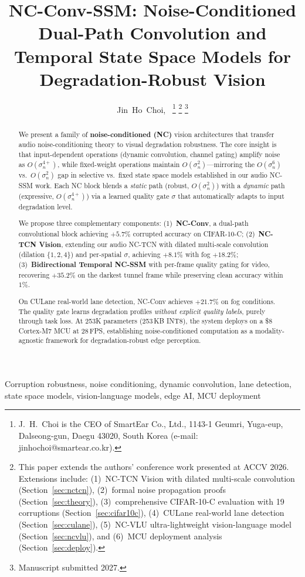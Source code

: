 \documentclass[journal]{IEEEtran}
\title{NC-Conv-SSM: Noise-Conditioned Dual-Path Convolution and Temporal State Space Models for Degradation-Robust Vision}
\author{Jin~Ho~Choi,~\IEEEmembership{Member,~IEEE}%
\thanks{J.~H.~Choi is the CEO of SmartEar Co., Ltd., 1143-1 Geumri, Yuga-eup, Dalseong-gun, Daegu 43020, South Korea (e-mail: jinhochoi@smartear.co.kr).}%
\thanks{This paper extends the authors' conference work presented at ACCV 2026. Extensions include: (1)~NC-TCN Vision with dilated multi-scale convolution (Section~\ref{sec:nctcn}), (2)~formal noise propagation proofs (Section~\ref{sec:theory}), (3)~comprehensive CIFAR-10-C evaluation with 19 corruptions (Section~\ref{sec:cifar10c}), (4)~CULane real-world lane detection (Section~\ref{sec:culane}), (5)~NC-VLU ultra-lightweight vision-language model (Section~\ref{sec:ncvlu}), and (6)~MCU deployment analysis (Section~\ref{sec:deploy}).}%
\thanks{Manuscript submitted 2027.}}
\begin{document}
\maketitle

\begin{abstract}
We present a family of \textbf{noise-conditioned (NC)} vision architectures that transfer audio noise-conditioning theory to visual degradation robustness.
The core insight is that input-dependent operations (dynamic convolution, channel gating) amplify noise as $O(\sigma_n^{4+})$, while fixed-weight operations maintain $O(\sigma_n^2)$---mirroring the $O(\sigma_n^6)$ vs.\ $O(\sigma_n^2)$ gap in selective vs.\ fixed state space models established in our audio NC-SSM work.
Each NC block blends a \textcolor{fixcolor}{\emph{static}} path (robust, $O(\sigma_n^2)$) with a \textcolor{dyncolor}{\emph{dynamic}} path (expressive, $O(\sigma_n^{4+})$) via a learned quality gate $\sigma$ that automatically adapts to input degradation level.

We propose three complementary components:
(1)~\textbf{NC-Conv}, a dual-path convolutional block achieving $+5.7\%$ corrupted accuracy on CIFAR-10-C;
(2)~\textbf{NC-TCN Vision}, extending our audio NC-TCN with dilated multi-scale convolution (dilation $\{1,2,4\}$) and per-spatial $\sigma$, achieving $\mathbf{+8.1\%}$ with fog $+18.2\%$;
(3)~\textbf{Bidirectional Temporal NC-SSM} with per-frame quality gating for video, recovering $\mathbf{+35.2\%}$ on the darkest tunnel frame while preserving clean accuracy within $1\%$.

On CULane real-world lane detection, NC-Conv achieves $+21.7\%$ on fog conditions.
The quality gate learns degradation profiles \emph{without explicit quality labels}, purely through task loss.
At 253K parameters (253\,KB INT8), the system deploys on a \$8 Cortex-M7 MCU at 28\,FPS, establishing noise-conditioned computation as a modality-agnostic framework for degradation-robust edge perception.
\end{abstract}

\begin{IEEEkeywords}
Corruption robustness, noise conditioning, dynamic convolution, lane detection, state space models, vision-language models, edge AI, MCU deployment
\end{IEEEkeywords}


\end{document}
